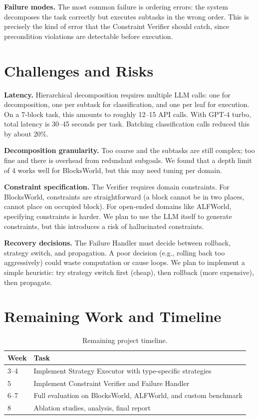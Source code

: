 \documentclass{article}
\begin{document}
\textbf{Failure modes.} The most common failure is ordering errors: the system decomposes the task correctly but executes subtasks in the wrong order. This is precisely the kind of error that the Constraint Verifier should catch, since precondition violations are detectable before execution.

\section{Challenges and Risks}

\textbf{Latency.} Hierarchical decomposition requires multiple LLM calls: one for decomposition, one per subtask for classification, and one per leaf for execution. On a 7-block task, this amounts to roughly 12--15 API calls. With GPT-4 turbo, total latency is 30--45 seconds per task. Batching classification calls reduced this by about 20\%.

\textbf{Decomposition granularity.} Too coarse and the subtasks are still complex; too fine and there is overhead from redundant subgoals. We found that a depth limit of 4 works well for BlocksWorld, but this may need tuning per domain.

\textbf{Constraint specification.} The Verifier requires domain constraints. For BlocksWorld, constraints are straightforward (a block cannot be in two places, cannot place on occupied block). For open-ended domains like ALFWorld, specifying constraints is harder. We plan to use the LLM itself to generate constraints, but this introduces a risk of hallucinated constraints.

\textbf{Recovery decisions.} The Failure Handler must decide between rollback, strategy switch, and propagation. A poor decision (e.g., rolling back too aggressively) could waste computation or cause loops. We plan to implement a simple heuristic: try strategy switch first (cheap), then rollback (more expensive), then propagate.

\section{Remaining Work and Timeline}

\begin{table}[h]
\centering
\begin{tabular}{ll}
\toprule
\textbf{Week} & \textbf{Task} \\
\midrule
3--4 & Implement Strategy Executor with type-specific strategies \\
5 & Implement Constraint Verifier and Failure Handler \\
6--7 & Full evaluation on BlocksWorld, ALFWorld, and custom benchmark \\
8 & Ablation studies, analysis, final report \\
\bottomrule
\end{tabular}
\caption{Remaining project timeline.}
\label{tab:timeline}
\end{table}
\end{document}
